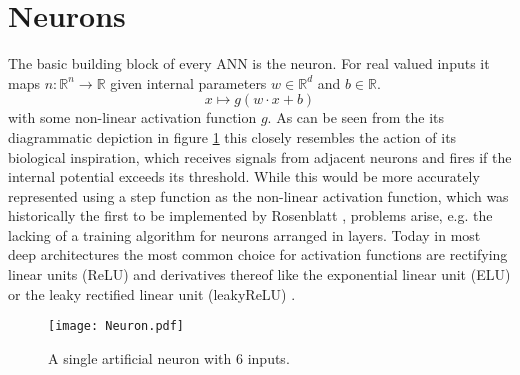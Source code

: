 \section{Neurons}
\label{sec:Neurons}
The basic building block of every ANN is the neuron. For real valued inputs it maps $n: \mathbb{R}^n \rightarrow \mathbb{R}$ given internal parameters $w \in \mathbb{R}^d$ and $b \in \mathbb{R}$.
\begin{equation}
x \mapsto g(w \cdot x + b)
\end{equation}
with some non-linear activation function $g$. As can be seen from the its diagrammatic depiction in figure \ref{fig:Neuron} this closely resembles the action of its biological inspiration, which receives signals from adjacent neurons and fires if the internal potential exceeds its threshold. While this would be more accurately represented using a step function as the non-linear activation function, which was historically the first to be implemented by Rosenblatt \cite{Perceptron}, problems arise, e.g. the lacking of a training algorithm for neurons arranged in layers. Today in most deep architectures the most common choice for activation functions are rectifying linear units (ReLU) and derivatives thereof like the exponential linear unit (ELU) \cite{Clevert2015} or the leaky rectified linear unit (leakyReLU) \cite{Maas2013}.
\begin{figure}
\centering
  \texttt{[image: Neuron.pdf]}
  \caption{A single artificial neuron with $6$ inputs.}
  \label{fig:Neuron}
\end{figure}

